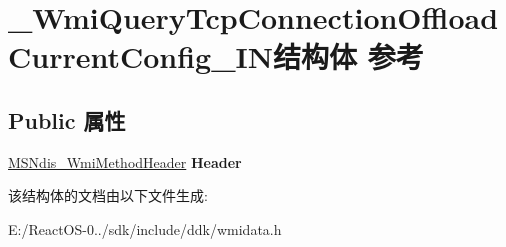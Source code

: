 \hypertarget{struct___wmi_query_tcp_connection_offload_current_config___i_n}{}\section{\+\_\+\+Wmi\+Query\+Tcp\+Connection\+Offload\+Current\+Config\+\_\+\+I\+N结构体 参考}
\label{struct___wmi_query_tcp_connection_offload_current_config___i_n}
\subsection*{Public 属性}
\begin{DoxyCompactItemize}
\item 
\mbox{\label{struct___wmi_query_tcp_connection_offload_current_config___i_n_a9931cb84942edc059821002f62c69584}} 
\hyperlink{struct___m_s_ndis___wmi_method_header}{M\+S\+Ndis\+\_\+\+Wmi\+Method\+Header} {\bfseries Header}
\end{DoxyCompactItemize}


该结构体的文档由以下文件生成\+:\begin{DoxyCompactItemize}
\item 
E\+:/\+React\+O\+S-\/0../sdk/include/ddk/wmidata.\+h\end{DoxyCompactItemize}
